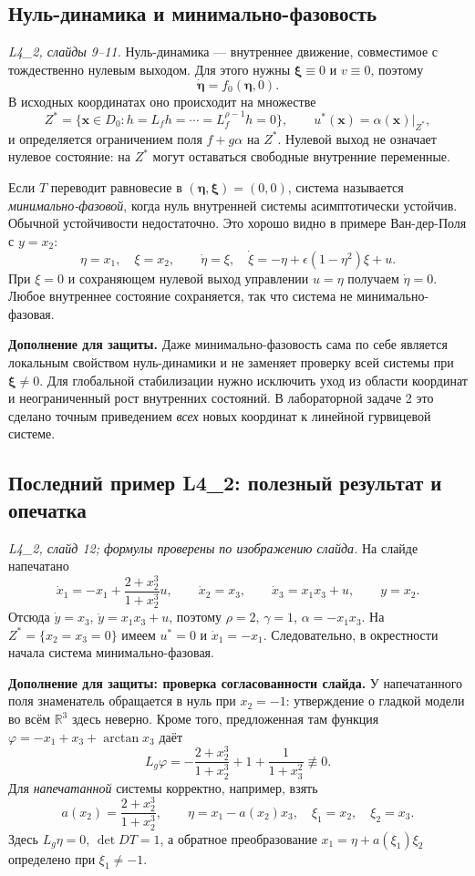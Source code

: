 \subsection{Нуль-динамика и минимально-фазовость}

\textit{L4\_2, слайды 9--11.}
Нуль-динамика --- внутреннее движение, совместимое с тождественно
нулевым выходом. Для этого нужны $\bm\xi\equiv0$ и $v\equiv0$,
поэтому
\[
 \dot{\bm\eta}=f_0(\bm\eta,0).
\]
В исходных координатах оно происходит на множестве
\[
 Z^*=\{\bm x\in D_0:h=L_fh=\cdots=L_f^{\rho-1}h=0\},
 \qquad u^*(\bm x)=\left.\alpha(\bm x)\right|_{Z^*},
\]
и определяется ограничением поля
$f+g\alpha$ на $Z^*$. Нулевой выход не означает нулевое состояние:
на $Z^*$ могут оставаться свободные внутренние переменные.

Если $T$ переводит равновесие в $(\bm\eta,\bm\xi)=(0,0)$,
система называется \emph{минимально-фазовой}, когда нуль внутренней
системы асимптотически устойчив. Обычной устойчивости недостаточно.
Это хорошо видно в примере Ван-дер-Поля с $y=x_2$:
\[
 \eta=x_1,\quad\xi=x_2,\qquad
 \dot\eta=\xi,\quad
 \dot\xi=-\eta+\epsilon(1-\eta^2)\xi+u.
\]
При $\xi=0$ и сохраняющем нулевой выход управлении $u=\eta$
получаем $\dot\eta=0$. Любое внутреннее состояние сохраняется,
так что система не минимально-фазовая.

\textbf{Дополнение для защиты.} Даже минимально-фазовость сама по
себе является локальным свойством нуль-динамики и не заменяет
проверку всей системы при $\bm\xi\ne0$. Для глобальной стабилизации
нужно исключить уход из области координат и неограниченный рост
внутренних состояний. В лабораторной задаче 2 это сделано точным
приведением \emph{всех} новых координат к линейной гурвицевой системе.

\subsection{Последний пример L4\_2: полезный результат и опечатка}

\textit{L4\_2, слайд 12; формулы проверены по изображению слайда.}
На слайде напечатано
\[
 \dot x_1=-x_1+\frac{2+x_2^3}{1+x_2^3}u,\qquad
 \dot x_2=x_3,\qquad\dot x_3=x_1x_3+u,\qquad y=x_2.
\]
Отсюда $\dot y=x_3$, $\ddot y=x_1x_3+u$, поэтому
$\rho=2$, $\gamma=1$, $\alpha=-x_1x_3$.
На $Z^*=\{x_2=x_3=0\}$ имеем $u^*=0$ и
$\dot x_1=-x_1$. Следовательно, в окрестности начала система
минимально-фазовая.

\textbf{Дополнение для защиты: проверка согласованности слайда.}
У напечатанного поля знаменатель обращается в нуль при $x_2=-1$:
утверждение о гладкой модели во всём $\mathbb R^3$ здесь неверно.
Кроме того, предложенная там функция
$\varphi=-x_1+x_3+\arctan x_3$ даёт
\[
 L_g\varphi=-\frac{2+x_2^3}{1+x_2^3}
              +1+\frac{1}{1+x_3^2}\not\equiv0.
\]
Для \emph{напечатанной} системы корректно, например, взять
\[
 a(x_2)=\frac{2+x_2^3}{1+x_2^3},\qquad
 \eta=x_1-a(x_2)x_3,\quad \xi_1=x_2,\quad\xi_2=x_3.
\]
Здесь $L_g\eta=0$, $\det DT=1$, а обратное преобразование
$x_1=\eta+a(\xi_1)\xi_2$ определено при $\xi_1\ne-1$.

